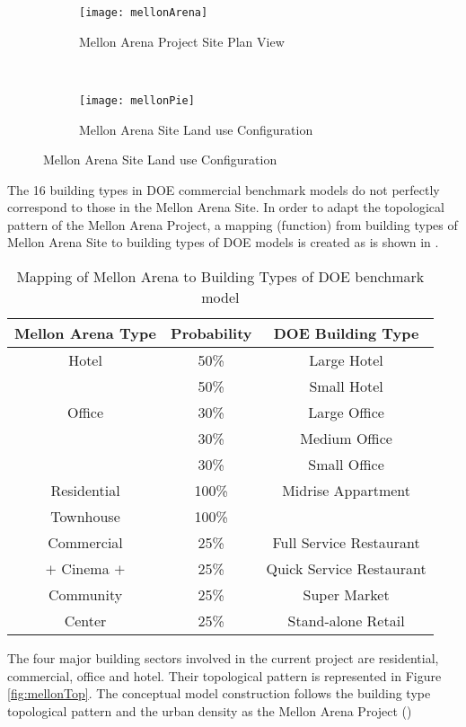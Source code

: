 \begin{figure}[h!]
  \centering
  \begin{subfigure}{0.5\textwidth}
  \centering
  \texttt{[image: mellonArena]}
  \caption[Mellon Arena Site Plan]{Mellon Arena Project Site Plan View}
  \label{fig:mellonArena}
\end{subfigure}
~
\begin{subfigure}{0.3\textwidth}
  \centering
  \texttt{[image: mellonPie]}
  \caption[Mellon Arena Site Land Use]{Mellon Arena Site Land use Configuration}
  \label{fig:mellonPie}
\end{subfigure}
\end{figure}
The 16 building types in DOE commercial benchmark models do not
perfectly correspond to those in the Mellon Arena Site. In order to
adapt the topological pattern of the Mellon Arena Project, a mapping
(function) from building types of Mellon Arena Site to building types
of DOE models is created as is shown in .
\begin{table}[h!]
  \centering
  \begin{tabular}{c| c| c}
    \hline
    Mellon Arena Type &Probability &DOE Building Type\\
    \hline
    \hline
    Hotel &50\%&Large Hotel\\
    \cline{2-3}
    &50\%&Small Hotel\\
    \hline
    Office &30\%&Large Office\\
    \cline{2-3}
    &30\%&Medium Office\\
    \cline{2-3}
    &30\%&Small Office\\
    \hline
    Residential &100\%&Midrise Appartment\\
    \cline{1-2}
    Townhouse &100\%&\\
    \hline
    Commercial &25\%&Full Service Restaurant\\
    \cline{2-3}
    $+$ Cinema $+$&25\%&Quick Service Restaurant\\
    \cline{2-3}
    Community &25\%&Super Market\\
    \cline{2-3}
    Center &25\%&Stand-alone Retail\\
    \hline
  \end{tabular}
  \caption{Mapping of Mellon Arena to Building Types of DOE benchmark model}
  \label{tab:typeMap}
\end{table}

The four major building sectors involved in the current project are
residential, commercial, office and hotel. Their topological pattern
is represented in Figure \ref{fig:mellonTop}. The conceptual model
construction follows the building type topological pattern and the
urban density as the Mellon Arena Project ()

